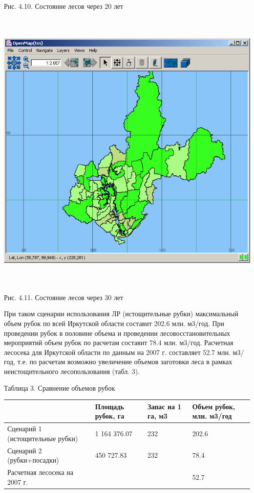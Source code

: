 \documentclass{article}
\begin{document}
\begin{center}
Рис. 4.10. Состояние  лесов через 20 лет

\includegraphics[width=452pt, height=407pt, keepaspectratio=true]{asyaDisser9_3-fig022.png}

Рис. 4.11. Состояние  лесов через 30 лет
\end{center}

При таком сценарии использования ЛР (истощительные 
рубки) максимальный объем рубок по всей Иркутской 
области составит 202.6 млн. м3/год. При проведении 
рубок в половине объема и проведении лесовосстановительных 
мероприятий объем рубок по расчетам составит 
78.4 млн. м3/год. Расчетная лесосека для Иркутской 
области по данным на 2007 г. составляет 52.7 млн. 
м3/год, т.е. по расчетам возможно увеличение 
объемов заготовки леса в рамках неистощительного 
лесопользования (табл. 3).

\begin{flushright}
Таблица 3. Сравнение объемов рубок

\begin{tabular}{|>{\raggedright}p{151pt}|>{\raggedright}p{94pt}|>{\raggedright}p{58pt}|>{\raggedright}p{101pt}|}
\hline
~ & Площадь рубок, га & Запас на 1 га, м3 & Объем 
рубок,  млн. м3/год\tabularnewline
\hline
Сценарий 1 (истощительные рубки) & 1 164 376.07 & 232 & 202.6\tabularnewline
\hline
Сценарий 2 (рубки+посадки) & 450 727.83 & 232 & 78.4\tabularnewline
\hline
Расчетная лесосека на 2007 г.~ & ~ &  & 52.7\tabularnewline
\hline
\end{tabular}
\end{flushright}
\end{document}
